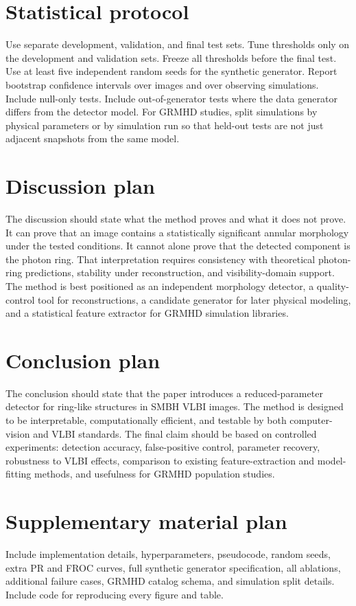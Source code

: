 \documentclass[11pt]{article}
\begin{document}
\section{Statistical protocol}

Use separate development, validation, and final test sets. Tune thresholds only on the development and validation sets. Freeze all thresholds before the final test. Use at least five independent random seeds for the synthetic generator. Report bootstrap confidence intervals over images and over observing simulations. Include null-only tests. Include out-of-generator tests where the data generator differs from the detector model. For GRMHD studies, split simulations by physical parameters or by simulation run so that held-out tests are not just adjacent snapshots from the same model.

\section{Discussion plan}

The discussion should state what the method proves and what it does not prove. It can prove that an image contains a statistically significant annular morphology under the tested conditions. It cannot alone prove that the detected component is the photon ring. That interpretation requires consistency with theoretical photon-ring predictions, stability under reconstruction, and visibility-domain support. The method is best positioned as an independent morphology detector, a quality-control tool for reconstructions, a candidate generator for later physical modeling, and a statistical feature extractor for GRMHD simulation libraries.

\section{Conclusion plan}

The conclusion should state that the paper introduces a reduced-parameter detector for ring-like structures in SMBH VLBI images. The method is designed to be interpretable, computationally efficient, and testable by both computer-vision and VLBI standards. The final claim should be based on controlled experiments: detection accuracy, false-positive control, parameter recovery, robustness to VLBI effects, comparison to existing feature-extraction and model-fitting methods, and usefulness for GRMHD population studies.

\section{Supplementary material plan}

Include implementation details, hyperparameters, pseudocode, random seeds, extra PR and FROC curves, full synthetic generator specification, all ablations, additional failure cases, GRMHD catalog schema, and simulation split details. Include code for reproducing every figure and table.



\end{document}

